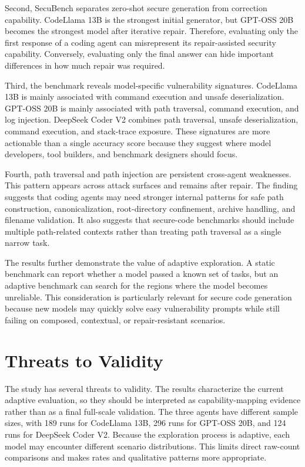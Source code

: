 \documentclass[11pt]{article}
\newcommand{\toolname}{SecuBench}
\begin{document}
Second, \toolname{} separates zero-shot secure generation from correction capability. CodeLlama 13B is the strongest initial generator, but GPT-OSS 20B becomes the strongest model after iterative repair. Therefore, evaluating only the first response of a coding agent can misrepresent its repair-assisted security capability. Conversely, evaluating only the final answer can hide important differences in how much repair was required.

Third, the benchmark reveals model-specific vulnerability signatures. CodeLlama 13B is mainly associated with command execution and unsafe deserialization. GPT-OSS 20B is mainly associated with path traversal, command execution, and log injection. DeepSeek Coder V2 combines path traversal, unsafe deserialization, command execution, and stack-trace exposure. These signatures are more actionable than a single accuracy score because they suggest where model developers, tool builders, and benchmark designers should focus.

Fourth, path traversal and path injection are persistent cross-agent weaknesses. This pattern appears across attack surfaces and remains after repair. The finding suggests that coding agents may need stronger internal patterns for safe path construction, canonicalization, root-directory confinement, archive handling, and filename validation. It also suggests that secure-code benchmarks should include multiple path-related contexts rather than treating path traversal as a single narrow task.

The results further demonstrate the value of adaptive exploration. A static benchmark can report whether a model passed a known set of tasks, but an adaptive benchmark can search for the regions where the model becomes unreliable. This consideration is particularly relevant for secure code generation because new models may quickly solve easy vulnerability prompts while still failing on composed, contextual, or repair-resistant scenarios.

\FloatBarrier
\section{Threats to Validity}

The study has several threats to validity. The results characterize the current adaptive evaluation, so they should be interpreted as capability-mapping evidence rather than as a final full-scale validation. The three agents have different sample sizes, with 189 runs for CodeLlama 13B, 296 runs for GPT-OSS 20B, and 124 runs for DeepSeek Coder V2. Because the exploration process is adaptive, each model may encounter different scenario distributions. This limits direct raw-count comparisons and makes rates and qualitative patterns more appropriate.
\end{document}
